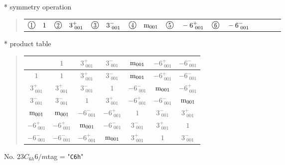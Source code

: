 \documentclass[fleqn,10pt,landscape]{jsarticle}
\begin{document}
* symmetry operation
\begin{quote}
\begin{tabular}{llllllllll}
$ {\ooalign{\hfil\resizebox{.8\width}{\height}{1}\hfil\crcr\raise.1ex\hbox{\large$\bigcirc$}}}\quad 1 $ & $ {\ooalign{\hfil\resizebox{.8\width}{\height}{2}\hfil\crcr\raise.1ex\hbox{\large$\bigcirc$}}}\quad 3^{+}_{\,\,001} $ & $ {\ooalign{\hfil\resizebox{.8\width}{\height}{3}\hfil\crcr\raise.1ex\hbox{\large$\bigcirc$}}}\quad 3^{-}_{\,\,001} $ & $ {\ooalign{\hfil\resizebox{.8\width}{\height}{4}\hfil\crcr\raise.1ex\hbox{\large$\bigcirc$}}}\quad {\rm m}_{001} $ & $ {\ooalign{\hfil\resizebox{.8\width}{\height}{5}\hfil\crcr\raise.1ex\hbox{\large$\bigcirc$}}}\quad -6^{+}_{\,\,001} $ & $ {\ooalign{\hfil\resizebox{.8\width}{\height}{6}\hfil\crcr\raise.1ex\hbox{\large$\bigcirc$}}}\quad -6^{-}_{\,\,001} $
\end{tabular}
\end{quote}

* product table
\begin{quote}
\begin{tabular}{ccccccc} \hline \hline
 & $ 1 $ & $ 3^{+}_{\,\,001} $ & $ 3^{-}_{\,\,001} $ & $ {\rm m}_{001} $ & $ -6^{+}_{\,\,001} $ & $ -6^{-}_{\,\,001} $ \\ \hline
$ 1 $ & $ 1 $ & $ 3^{+}_{\,\,001} $ & $ 3^{-}_{\,\,001} $ & $ {\rm m}_{001} $ & $ -6^{+}_{\,\,001} $ & $ -6^{-}_{\,\,001} $ \\
$ 3^{+}_{\,\,001} $ & $ 3^{+}_{\,\,001} $ & $ 3^{-}_{\,\,001} $ & $ 1 $ & $ -6^{-}_{\,\,001} $ & $ {\rm m}_{001} $ & $ -6^{+}_{\,\,001} $ \\
$ 3^{-}_{\,\,001} $ & $ 3^{-}_{\,\,001} $ & $ 1 $ & $ 3^{+}_{\,\,001} $ & $ -6^{+}_{\,\,001} $ & $ -6^{-}_{\,\,001} $ & $ {\rm m}_{001} $ \\
$ {\rm m}_{001} $ & $ {\rm m}_{001} $ & $ -6^{-}_{\,\,001} $ & $ -6^{+}_{\,\,001} $ & $ 1 $ & $ 3^{-}_{\,\,001} $ & $ 3^{+}_{\,\,001} $ \\
$ -6^{+}_{\,\,001} $ & $ -6^{+}_{\,\,001} $ & $ {\rm m}_{001} $ & $ -6^{-}_{\,\,001} $ & $ 3^{-}_{\,\,001} $ & $ 3^{+}_{\,\,001} $ & $ 1 $ \\
$ -6^{-}_{\,\,001} $ & $ -6^{-}_{\,\,001} $ & $ -6^{+}_{\,\,001} $ & $ {\rm m}_{001} $ & $ 3^{+}_{\,\,001} $ & $ 1 $ & $ 3^{-}_{\,\,001} $ \\
 \hline \hline
\end{tabular}
\end{quote}

\newpage

No. 23\quad$C_{6h}$\quad$6/m$\quad[ hexagonal ]
tag = "{\tt C6h}"
\end{document}

